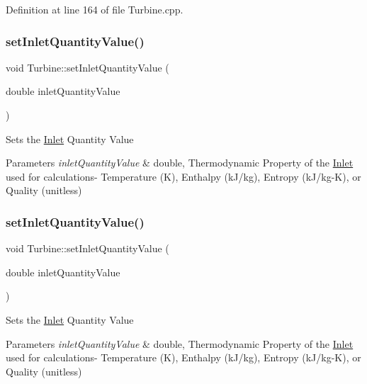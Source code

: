 Definition at line 164 of file Turbine.\+cpp.

\mbox{\label{class_turbine_ac01a053462c83e21ecc2158e75477542}} 
\subsubsection{\texorpdfstring{set\+Inlet\+Quantity\+Value()}{setInletQuantityValue()}\hspace{0.1cm}{\footnotesize\ttfamily [2/3]}}
{\footnotesize\ttfamily void Turbine\+::set\+Inlet\+Quantity\+Value (\begin{DoxyParamCaption}\item[{double}]{inlet\+Quantity\+Value }\end{DoxyParamCaption})}

Sets the \hyperlink{class_inlet}{Inlet} Quantity Value


\begin{DoxyParams}{Parameters}
{\em inlet\+Quantity\+Value} & double, Thermodynamic Property of the \hyperlink{class_inlet}{Inlet} used for calculations-\/ Temperature (K), Enthalpy (k\+J/kg), Entropy (k\+J/kg-\/K), or Quality (unitless) \\
\hline
\end{DoxyParams}
\mbox{\label{class_turbine_ac01a053462c83e21ecc2158e75477542}} 
\subsubsection{\texorpdfstring{set\+Inlet\+Quantity\+Value()}{setInletQuantityValue()}\hspace{0.1cm}{\footnotesize\ttfamily [3/3]}}
{\footnotesize\ttfamily void Turbine\+::set\+Inlet\+Quantity\+Value (\begin{DoxyParamCaption}\item[{double}]{inlet\+Quantity\+Value }\end{DoxyParamCaption})}

Sets the \hyperlink{class_inlet}{Inlet} Quantity Value


\begin{DoxyParams}{Parameters}
{\em inlet\+Quantity\+Value} & double, Thermodynamic Property of the \hyperlink{class_inlet}{Inlet} used for calculations-\/ Temperature (K), Enthalpy (k\+J/kg), Entropy (k\+J/kg-\/K), or Quality (unitless) \\
\hline
\end{DoxyParams}
\mbox{\label{class_turbine_ae67daa481ef48bcf8aef84bcccb4611d}} 
